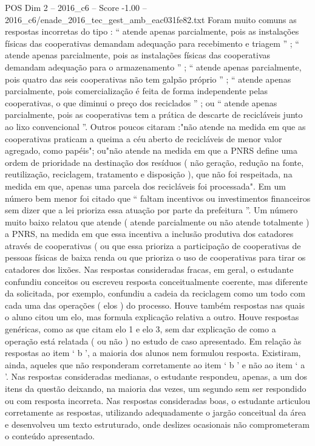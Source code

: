 \begin{textsample}{POS Dim 2 – 2016\_c6 – Score -1.00 – 2016\_c6/enade\_2016\_tec\_gest\_amb\_eac031fe82.txt}
Foram muito comuns as respostas incorretas do tipo : “ atende apenas parcialmente, pois as instalações físicas das cooperativas demandam adequação para recebimento e triagem ” ; “ atende apenas parcialmente, pois as instalações físicas das cooperativas demandam adequação para o armazenamento ” ; “ atende apenas parcialmente, pois quatro das seis cooperativas não tem galpão próprio ” ; “ atende apenas parcialmente, pois comercialização é feita de forma independente pelas cooperativas, o que diminui o preço dos reciclados ” ; ou “ atende apenas parcialmente, pois as cooperativas tem a prática de descarte de recicláveis junto ao lixo convencional ”.
Outros poucos citaram :"não atende na medida em que as cooperativas praticam a queima a céu aberto de recicláveis de menor valor agregado, como papéis"; ou"não atende na medida em que a PNRS define uma ordem de prioridade na destinação dos resíduos ( não geração, redução na fonte, reutilização, reciclagem, tratamento e disposição ), que não foi respeitada, na medida em que, apenas uma parcela dos recicláveis foi processada".
Em um número bem menor foi citado que “ faltam incentivos ou investimentos financeiros sem dizer que a lei prioriza essa atuação por parte da prefeitura ”.
Um número muito baixo relatou que atende ( atende parcialmente ou não atende totalmente ) a PNRS, na medida em que essa incentiva a inclusão produtiva dos catadores através de cooperativas ( ou que essa prioriza a participação de cooperativas de pessoas físicas de baixa renda ou que prioriza o uso de cooperativas para tirar os catadores dos lixões.
Nas respostas consideradas fracas, em geral, o estudante confundiu conceitos ou escreveu resposta conceitualmente coerente, mas diferente da solicitada, por exemplo, confundiu a cadeia da reciclagem como um todo com cada uma das operações ( elos ) do processo.
Houve também respostas nas quais o aluno citou um elo, mas formula explicação relativa a outro.
Houve respostas genéricas, como as que citam elo 1 e elo 3, sem dar explicação de como a operação está relatada ( ou não ) no estudo de caso apresentado.
Em relação às respostas ao item ‘ b ’, a maioria dos alunos nem formulou resposta.
Existiram, ainda, aqueles que não responderam corretamente ao item ‘ b ’ e não ao item ‘ a ’.
Nas respostas consideradas medianas, o estudante respondeu, apenas, a um dos itens da questão deixando, na maioria das vezes, um segundo sem ser respondido ou com resposta incorreta.
Nas respostas consideradas boas, o estudante articulou corretamente as respostas, utilizando adequadamente o jargão conceitual da área e desenvolveu um texto estruturado, onde deslizes ocasionais não comprometeram o conteúdo apresentado.

\end{textsample}
